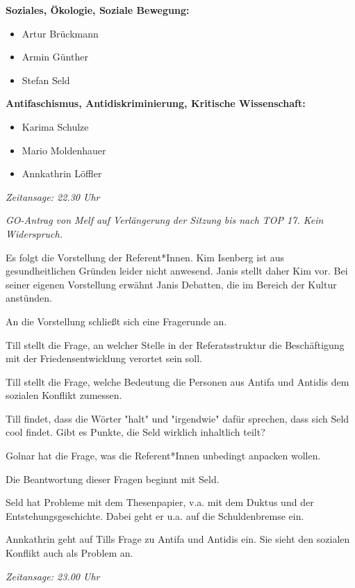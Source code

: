 \documentclass[ngerman,headheight=70pt]{scrartcl}
\begin{document}
    \textbf{Soziales, Ökologie, Soziale Bewegung:}
    \begin{itemize}
        \item Artur Brückmann
        \item Armin Günther
        \item Stefan Seld
    \end{itemize}

    \textbf{Antifaschismus, Antidiskriminierung, Kritische Wissenschaft:}
    \begin{itemize}
        \item Karima Schulze
        \item Mario Moldenhauer
        \item Annkathrin Löffler
    \end{itemize}

    \textit{Zeitansage: 22.30 Uhr}

    \textit{GO-Antrag von Melf auf Verlängerung der Sitzung bis nach TOP 17.
    Kein Widerspruch.}

    Es folgt die Vorstellung der Referent*Innen. Kim Isenberg ist aus
    gesundheitlichen Gründen leider nicht anwesend. Janis stellt daher Kim vor.
    Bei seiner eigenen Vorstellung erwähnt Janis Debatten, die im Bereich der
    Kultur anstünden.

    An die Vorstellung schließt sich eine Fragerunde an.

    Till stellt die Frage, an welcher Stelle in der Referatsstruktur die
    Beschäftigung mit der Friedensentwicklung verortet sein soll.

    Till stellt die Frage, welche Bedeutung die Personen aus Antifa und Antidis
    dem sozialen Konflikt zumessen.

    Till findet, dass die Wörter "halt" und "irgendwie" dafür sprechen, dass sich
    Seld cool findet. Gibt es Punkte, die Seld wirklich inhaltlich teilt?

    Golnar hat die Frage, was die Referent*Innen unbedingt anpacken wollen.

    Die Beantwortung dieser Fragen beginnt mit Seld.

    Seld hat Probleme mit dem Thesenpapier, v.a. mit dem Duktus und der
    Entstehungsgeschichte. Dabei geht er u.a. auf die Schuldenbremse ein.

    Annkathrin geht auf Tills Frage zu Antifa und Antidis ein. Sie sieht
    den sozialen Konflikt auch als Problem an.

    \textit{Zeitansage: 23.00 Uhr}
\end{document}
